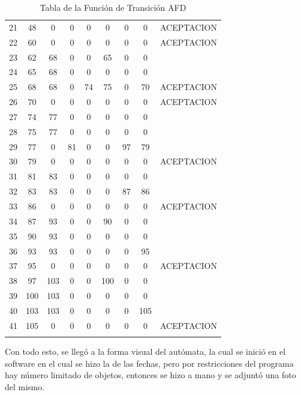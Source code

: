 \begin{longtable}{||c|c||cccccc||c||}
21 & 48        & 0     & 0  & 0  & 0     & 0     & 0     & ACEPTACION  \\
22 & 60        & 0     & 0  & 0  & 0     & 0     & 0     & ACEPTACION  \\
23 & 62        & 68    & 0  & 0  & 65    & 0     & 0     &             \\
24 & 65        & 68    & 0  & 0  & 0     & 0     & 0     &             \\
25 & 68        & 68    & 0  & 74 & 75    & 0     & 70    & ACEPTACION  \\
26 & 70        & 0     & 0  & 0  & 0     & 0     & 0     & ACEPTACION  \\
27 & 74        & 77    & 0  & 0  & 0     & 0     & 0     &             \\
28 & 75        & 77    & 0  & 0  & 0     & 0     & 0     &             \\
29 & 77        & 0     & 81 & 0  & 0     & 97    & 79    &             \\
30 & 79        & 0     & 0  & 0  & 0     & 0     & 0     & ACEPTACION  \\
31 & 81        & 83    & 0  & 0  & 0     & 0     & 0     &             \\
32 & 83        & 83    & 0  & 0  & 0     & 87    & 86    &             \\
33 & 86        & 0     & 0  & 0  & 0     & 0     & 0     & ACEPTACION  \\
34 & 87        & 93    & 0  & 0  & 90    & 0     & 0     &             \\
35 & 90        & 93    & 0  & 0  & 0     & 0     & 0     &             \\
36 & 93        & 93    & 0  & 0  & 0     & 0     & 95    &             \\
37 & 95        & 0     & 0  & 0  & 0     & 0     & 0     & ACEPTACION  \\
38 & 97        & 103   & 0  & 0  & 100   & 0     & 0     &             \\
39 & 100       & 103   & 0  & 0  & 0     & 0     & 0     &             \\
40 & 103       & 103   & 0  & 0  & 0     & 0     & 105   &             \\
41 & 105       & 0     & 0  & 0  & 0     & 0     & 0     & ACEPTACION  \\
\hline
\hline

\caption{Tabla de la Función de Transición AFD}
\label{AFDnumeros}
\end{longtable}


Con todo esto, se llegó a la forma visual del autómata, la cual se inició en el software en el cual se hizo la de las fechas, pero por restricciones del programa hay número limitado de objetos, entonces se hizo a mano y se adjuntó una foto del mismo.










